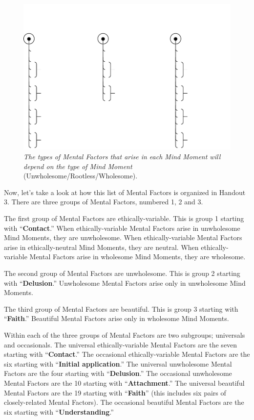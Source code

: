 \begin{figure}[H]
\centering
\includegraphics[width=1.0\linewidth]{./Diagrams/Ment_Fact}
\caption{{\small \textit{The types of Mental Factors that arise in each Mind Moment will depend on the type of Mind Moment }(Unwholesome/Rootless/Wholesome).}}
\label{fig:MentalFactors}
\end{figure}

Now, let’s take a look at how this list of Mental Factors is organized in Handout 3. There are three groups of Mental Factors, numbered 1, 2 and 3.

The first group of Mental Factors are ethically-variable. This is group 1 starting with “\textbf{Contact}.” When ethically-variable Mental Factors arise in unwholesome Mind Moments, they are unwholesome. When ethically-variable Mental Factors arise in ethically-neutral Mind Moments, they are neutral. When ethically-variable Mental Factors arise in wholesome Mind Moments, they are wholesome.

The second group of Mental Factors are unwholesome. This is group 2 starting with “\textbf{Delusion}.” Unwholesome Mental Factors arise only in unwholesome Mind Moments.

The third group of Mental Factors are beautiful. This is group 3 starting with “\textbf{Faith}.” Beautiful Mental Factors arise only in wholesome Mind Moments.

Within each of the three groups of Mental Factors are two subgroups; universals and occasionals. The universal ethically-variable Mental Factors are the seven starting with “\textbf{Contact}.” The occasional ethically-variable Mental Factors are the six starting with “\textbf{Initial application}.” The universal unwholesome Mental Factors are the four starting with “\textbf{Delusion}.” The occasional unwholesome Mental Factors are the 10 starting with “\textbf{Attachment}.” The universal beautiful Mental Factors are the 19 starting with “\textbf{Faith}” (this includes six pairs of closely-related Mental Factors). The occasional beautiful Mental Factors are the six starting with “\textbf{Understanding}.”

